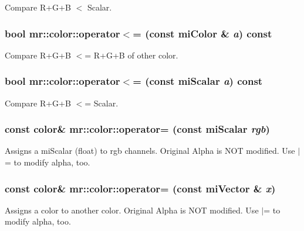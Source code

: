 Compare R+G+B $<$ Scalar. 

\subsubsection{\setlength{\rightskip}{0pt plus 5cm}bool mr::color::operator$<$= (const mi\-Color \& {\em a}) const\hspace{0.3cm}{\tt  [inline]}}\label{structmr_1_1color_z11_6}


Compare R+G+B $<$= R+G+B of other color. 

\subsubsection{\setlength{\rightskip}{0pt plus 5cm}bool mr::color::operator$<$= (const mi\-Scalar {\em a}) const\hspace{0.3cm}{\tt  [inline]}}\label{structmr_1_1color_z11_2}


Compare R+G+B $<$= Scalar. 

\subsubsection{\setlength{\rightskip}{0pt plus 5cm}const {\bf color}\& mr::color::operator= (const mi\-Scalar {\em rgb})\hspace{0.3cm}{\tt  [inline]}}\label{structmr_1_1color_z5_4}


Assigns a mi\-Scalar (float) to rgb channels. Original Alpha is NOT modified. Use $|$= to modify alpha, too. 
\subsubsection{\setlength{\rightskip}{0pt plus 5cm}const {\bf color}\& mr::color::operator= (const mi\-Vector \& {\em x})\hspace{0.3cm}{\tt  [inline]}}\label{structmr_1_1color_z5_3}


Assigns a color to another color. Original Alpha is NOT modified. Use $|$= to modify alpha, too. 
